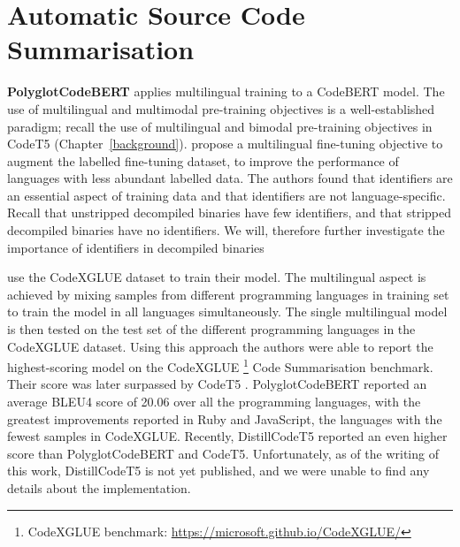 \section{Automatic Source Code Summarisation}
\textbf{PolyglotCodeBERT} \cite{PolyglotCodeBERT} applies multilingual training to a CodeBERT \cite{CodeBERT} model. The use of multilingual and multimodal pre-training objectives is a  well-established paradigm; recall the use of multilingual and bimodal pre-training objectives in CodeT5 \cite{CodeT5} (Chapter~\ref{background}). \citeauthor{PolyglotCodeBERT} propose a multilingual fine-tuning objective to augment the labelled fine-tuning dataset, to improve the performance of languages with less abundant labelled data. The authors found that identifiers are an essential aspect of training data and that identifiers are not language-specific. Recall that unstripped decompiled binaries have few identifiers, and that stripped decompiled binaries have no identifiers. We will, therefore further investigate the importance of identifiers in decompiled binaries

\citeauthor{PolyglotCodeBERT} use the CodeXGLUE dataset to train their model. The multilingual aspect is achieved by mixing samples from different programming languages in training set to train the model in all languages simultaneously. The single multilingual model is then tested on the test set of the different programming languages in the CodeXGLUE dataset. Using this approach the authors were able to report the highest-scoring model on the CodeXGLUE \cite{CodeXGlue} \footnote{CodeXGLUE benchmark: \url{https://microsoft.github.io/CodeXGLUE/}} Code Summarisation benchmark. Their score was later surpassed by CodeT5 \cite{CodeT5}. PolyglotCodeBERT reported an average BLEU4 score of 20.06 over all the programming languages, with the greatest improvements reported in Ruby and JavaScript, the languages with the fewest samples in CodeXGLUE. Recently, DistillCodeT5 reported an even higher score than PolyglotCodeBERT and CodeT5. Unfortunately, as of the writing of this work, DistillCodeT5 is not yet published, and we were unable to find any details about the implementation.


